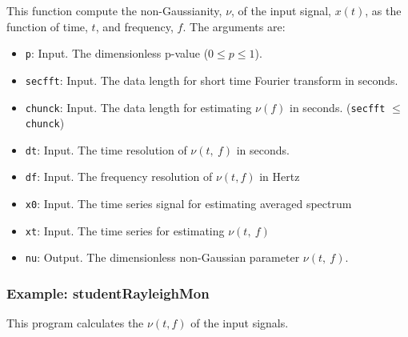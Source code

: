 This function compute the non-Gaussianity, $\nu$, of the input signal, $x(t)$, as the function of time, $t$, and frequency, $f$.
The arguments are:
\begin{itemize}
\item {\tt p}: Input. The dimensionless p-value ($0 \leq p \leq 1$).
\item {\tt secfft}: Input. The data length for short time Fourier transform in seconds.
\item {\tt chunck}: Input. The data length for estimating $\nu(f)$ in seconds. ({\tt secfft} $\leq$ {\tt chunck})
\item {\tt dt}: Input. The time resolution of $\nu(t,~f)$ in seconds.
\item {\tt df}: Input. The frequency resolution of $\nu(t, f)$ in Hertz
\item {\tt x0}: Input. The time series signal for estimating averaged spectrum
\item {\tt xt}: Input. The time series for estimating $\nu(t,~f)$
\item {\tt nu}: Output. The dimensionless non-Gaussian parameter $\nu(t,~f)$.
\end{itemize}

\subsubsection{{\bf Example:} studentRayleighMon}
This program calculates the $\nu(t, f)$ of the input signals.\\

